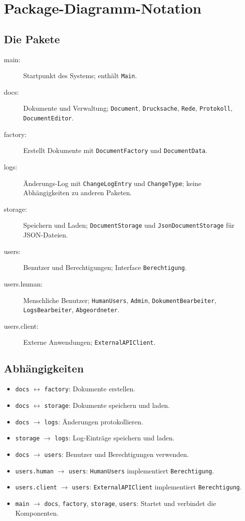 \section{Package-Diagramm-Notation}


\subsection{Die Pakete}
\begin{description}
    \item[main:] Startpunkt des Systems; enthält \texttt{Main}.
    \item[docs:] Dokumente und Verwaltung; \texttt{Document}, \texttt{Drucksache}, \texttt{Rede}, \texttt{Protokoll}, \texttt{DocumentEditor}.
    \item[factory:] Erstellt Dokumente mit \texttt{DocumentFactory} und \texttt{DocumentData}.
    \item[logs:] Änderungs-Log mit \texttt{ChangeLogEntry} und \texttt{ChangeType}; keine Abhängigkeiten zu anderen Paketen.
    \item[storage:] Speichern und Laden; \texttt{DocumentStorage} und \texttt{JsonDocumentStorage} für JSON-Dateien.
    \item[users:] Benutzer und Berechtigungen; Interface \texttt{Berechtigung}.
    \item[users.human:] Menschliche Benutzer; \texttt{HumanUsers}, \texttt{Admin}, \texttt{DokumentBearbeiter}, \texttt{LogsBearbeiter}, \texttt{Abgeordneter}.
    \item[users.client:] Externe Anwendungen; \texttt{ExternalAPIClient}.
\end{description}

\subsection{Abhängigkeiten}
\begin{itemize}
    \item \texttt{docs} $\leftrightarrow$ \texttt{factory}: Dokumente erstellen.
    \item \texttt{docs} $\leftrightarrow$ \texttt{storage}: Dokumente speichern und laden.
    \item \texttt{docs} $\rightarrow$ \texttt{logs}: Änderungen protokollieren.
    \item \texttt{storage} $\rightarrow$ \texttt{logs}: Log-Einträge speichern und laden.
    \item \texttt{docs} $\rightarrow$ \texttt{users}: Benutzer und Berechtigungen verwenden.
    \item \texttt{users.human} $\rightarrow$ \texttt{users}: \texttt{HumanUsers} implementiert \texttt{Berechtigung}.
    \item \texttt{users.client} $\rightarrow$ \texttt{users}: \texttt{ExternalAPIClient} implementiert \texttt{Berechtigung}.
    \item \texttt{main} $\rightarrow$ \texttt{docs}, \texttt{factory}, \texttt{storage}, \texttt{users}: Startet und verbindet die Komponenten.
\end{itemize}

